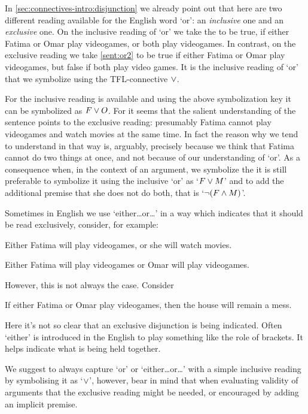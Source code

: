 In \cref{sec:connectives-intro:disjunction} we already point out that here are two different reading available for the English word `or': an \emph{inclusive} one and an \emph{exclusive} one. On the inclusive reading of `or' we take the  to be true, if either Fatima or Omar play videogames, or both play videogames. In contrast, on the exclusive reading we take \cref{sent:or2} to be true if either Fatima or Omar play videogames, but false if both play video games. It is the inclusive reading of `or' that we symbolize using the TFL-connective $\vee$.

For  the inclusive reading is available and using the above symbolization key it can be symbolized as $F\vee O$. For  it seems that the salient understanding of the sentence points to the exclusive reading: presumably Fatima cannot play videogames and watch movies at the same time. In fact the reason why we tend to understand  in that way is, arguably, precisely because we think that Fatima cannot do two things at once, and not because of our understanding of `or'. As a consequence when, in the context of an argument, we symbolize the  it is still preferable to symbolize it using the inclusive `or' as `$F\vee M$' and to add the additional premise that she does not do both, that is `$\neg(F\mathbin{\wedge} M)$'.

Sometimes in English we use `either\ldots or\ldots' in a way which indicates that it should be read exclusively, consider, for example:
\begin{samplesent}
		\item\label{sent:eor1} Either Fatima will play videogames, or she will watch movies.
		\item\label{sent:eor2} Either Fatima will play videogames or Omar will play videogames.
	\end{samplesent}
However, this is not always the case. 
Consider
\begin{samplesent}
	\item\label{sent:egsent:excl in cond} If either Fatima or Omar play videogames, then the house will remain a mess.
\end{samplesent}
Here it's not so clear that an exclusive disjunction is being indicated. Often `either' is introduced in the English to play something like the role of brackets. It helps indicate what is being held together. 

We suggest to always capture `or' or `either\ldots or\ldots' with a simple inclusive reading by symbolising it as `$\vee$', however, bear in mind that when evaluating validity of arguments that the exclusive reading might be needed, or encouraged by adding an implicit premise. 

